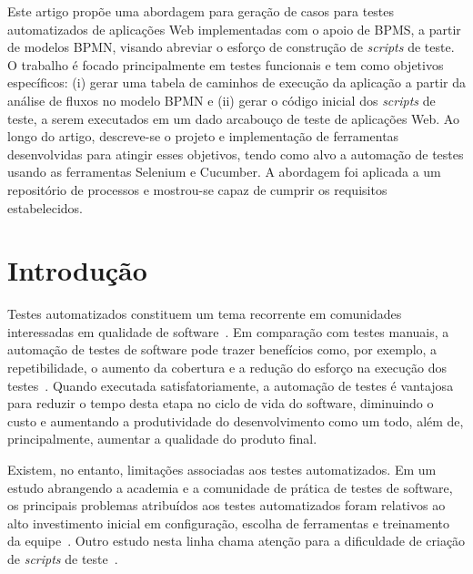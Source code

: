 \documentclass[12pt]{article}
\begin{document}
\begin{resumo} 

Este artigo propõe uma abordagem para geração de casos para testes automatizados de aplicações Web implementadas com o apoio de BPMS, a partir de modelos BPMN, visando abreviar o esforço de construção de \emph{scripts} de teste. O trabalho é focado principalmente em testes funcionais e tem como objetivos específicos: (i) gerar uma tabela de caminhos de execução da aplicação a partir da análise de fluxos no modelo BPMN e (ii) gerar o código inicial dos \emph{scripts} de teste, a serem executados em um dado arcabouço de teste de aplicações Web.
Ao longo do artigo, descreve-se o projeto e implementação de ferramentas desenvolvidas para atingir esses objetivos, tendo como alvo a automação de testes usando as ferramentas Selenium e Cucumber. A abordagem foi aplicada a um repositório de processos e mostrou-se capaz de cumprir os requisitos estabelecidos.


\end{resumo}

\section{Introdução}


Testes automatizados constituem um tema recorrente em comunidades interessadas em qualidade de software~\cite{Delamaro:2007, Dustin:2009}. Em comparação com testes manuais, a automação de testes de software pode trazer benefícios como, por exemplo, a repetibilidade, o aumento da cobertura e a redução do esforço na execução dos testes~\cite{Rafi:2012, sbqs2015:compara}. 
Quando executada satisfatoriamente, a automação de testes é vantajosa para reduzir o tempo desta etapa no ciclo de vida do software, diminuindo o custo e aumentando a produtividade do desenvolvimento como um todo, além de, principalmente, aumentar a qualidade do produto final.

Existem, no entanto, limitações associadas aos testes automatizados. Em um estudo abrangendo a academia e a comunidade de prática de testes de software, os principais problemas atribuídos aos testes automatizados foram relativos ao alto investimento inicial em configuração, escolha de ferramentas e treinamento da equipe~\cite{Rafi:2012}. Outro estudo nesta linha chama atenção para a dificuldade de criação de \emph{scripts} de teste~\cite{Wiklund:2014}.
\end{document}
